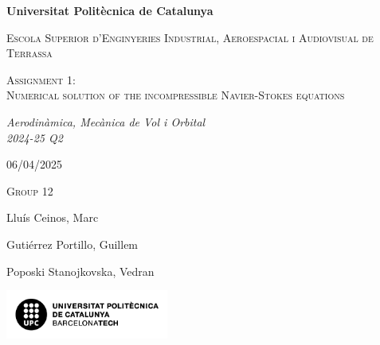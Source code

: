 \begin{titlepage}


\centering
{\bfseries\LARGE Universitat Politècnica de Catalunya\par}
{\scshape\Large Escola Superior d'Enginyeries Industrial, Aeroespacial i Audiovisual de Terrassa\par}
\vspace{2.5cm}
{\scshape\Huge Assignment 1:  \\Numerical solution of the incompressible Navier-Stokes equations
 \par}
\vspace{2cm}
{\itshape\Large Aerodinàmica, Mecànica de Vol i Orbital \\ 2024-25 Q2 \par}
\vspace{0.5cm}
{06/04/2025 \par}
\vspace{0.5cm}
{\scshape\Large Group 12  \par}
\vspace{0.2cm}
{\Large Lluís Ceinos, Marc \par}
{\Large Gutiérrez Portillo, Guillem \par}
{\Large Poposki Stanojkovska, Vedran \par}
\vspace{2.5cm}
\includegraphics[width=0.4\textwidth]{imatges/logo upc negre sobre blanc.png}


\end{titlepage}
\newpage